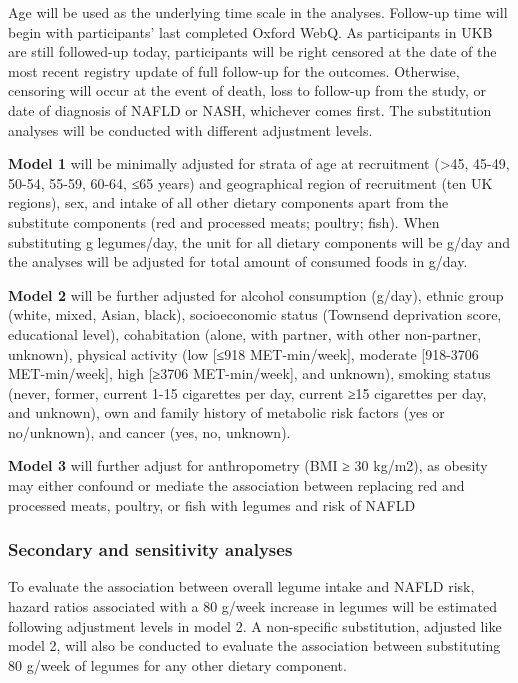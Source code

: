 \documentclass[
  11pt,
  a4paper,
  DIV=11,
  numbers=noendperiod,
  twocolumn]{scrartcl}
\begin{document}
Age will be used as the underlying time scale in the analyses. Follow-up
time will begin with participants' last completed Oxford WebQ. As
participants in UKB are still followed-up today, participants will be
right censored at the date of the most recent registry update of full
follow-up for the outcomes. Otherwise, censoring will occur at the event
of death, loss to follow-up from the study, or date of diagnosis of
NAFLD or NASH, whichever comes first. The substitution analyses will be
conducted with different adjustment levels.

\textbf{Model 1} will be minimally adjusted for strata of age at
recruitment (\textgreater45, 45-49, 50-54, 55-59, 60-64, ≤65 years) and
geographical region of recruitment (ten UK regions), sex, and intake of
all other dietary components apart from the substitute components (red
and processed meats; poultry; fish). When substituting g legumes/day,
the unit for all dietary components will be g/day and the analyses will
be adjusted for total amount of consumed foods in g/day.

\textbf{Model 2} will be further adjusted for alcohol consumption
(g/day), ethnic group (white, mixed, Asian, black), socioeconomic status
(Townsend deprivation score, educational level), cohabitation (alone,
with partner, with other non-partner, unknown), physical activity (low
{[}≤918 MET-min/week{]}, moderate {[}918-3706 MET-min/week{]}, high
{[}≥3706 MET-min/week{]}, and unknown), smoking status (never, former,
current 1-15 cigarettes per day, current ≥15 cigarettes per day, and
unknown), own and family history of metabolic risk factors (yes or
no/unknown), and cancer (yes, no, unknown).

\textbf{Model 3} will further adjust for anthropometry (BMI ≥ 30 kg/m2),
as obesity may either confound or mediate the association between
replacing red and processed meats, poultry, or fish with legumes and
risk of NAFLD

\hypertarget{secondary-and-sensitivity-analyses}{%
\subsubsection{Secondary and sensitivity
analyses}\label{secondary-and-sensitivity-analyses}}

To evaluate the association between overall legume intake and NAFLD
risk, hazard ratios associated with a 80 g/week increase in legumes will
be estimated following adjustment levels in model 2. A non-specific
substitution, adjusted like model 2, will also be conducted to evaluate
the association between substituting 80 g/week of legumes for any other
dietary component.
\end{document}
